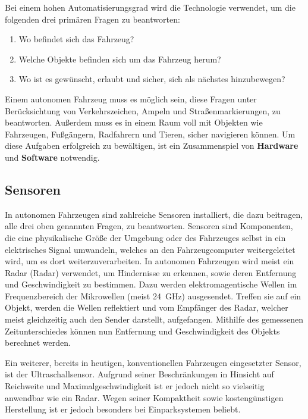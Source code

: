 Bei einem hohen Automatisierungsgrad wird die Technologie verwendet, um die folgenden drei primären Fragen zu beantworten:
\begin{enumerate}
  \item{Wo befindet sich das Fahrzeug?}
  \item{Welche Objekte befinden sich um das Fahrzeug herum?}
  \item{Wo ist es gewünscht, erlaubt und sicher, sich als nächstes hinzubewegen?}
\end{enumerate}

Einem autonomen Fahrzeug muss es möglich sein, diese Fragen unter Berücksichtung von Verkehrszeichen, Ampeln und Straßenmarkierungen, zu beantworten. Außerdem muss es in einem Raum voll mit Objekten wie Fahrzeugen, Fußgängern, Radfahrern und Tieren, sicher navigieren können. Um diese Aufgaben erfolgreich zu bewältigen, ist ein Zusammenspiel von \textbf{Hardware} und \textbf{Software} notwendig.

\subsection{Sensoren}
In autonomen Fahrzeugen sind zahlreiche Sensoren installiert, die dazu beitragen, alle drei oben genannten Fragen, zu beantworten. Sensoren sind Komponenten, die eine physikalische Größe der Umgebung oder des Fahrzeuges selbst in ein elektrisches Signal umwandeln, welches an den Fahrzeugcomputer weitergeleitet wird, um es dort weiterzuverarbeiten.  In autonomen Fahrzeugen wird meist ein \acs{Radar} (\acl{Radar}) verwendet, um Hindernisse zu erkennen, sowie deren Entfernung und Geschwindigkeit zu bestimmen. Dazu werden elektromagentische Wellen im Frequenzbereich der Mikrowellen (meist \SI{24}{\giga\hertz}) ausgesendet. Treffen sie auf ein Objekt, werden die Wellen reflektiert und vom Empfänger des \acs{Radar}, welcher meist gleichzeitig auch den Sender darstellt, aufgefangen. Mithilfe des gemessenen Zeitunterschiedes können nun Entfernung und Geschwindigkeit des Objekts berechnet werden. 

Ein weiterer, bereits in heutigen, konventionellen Fahrzeugen eingesetzter Sensor, ist der Ultraschallsensor. Aufgrund seiner Beschränkungen in Hinsicht auf Reichweite und Maximalgeschwindigkeit ist er jedoch nicht so vielseitig anwendbar wie ein \acs{Radar}. Wegen seiner Kompaktheit sowie kostengünstigen Herstellung ist er jedoch besonders bei Einparksystemen beliebt.

